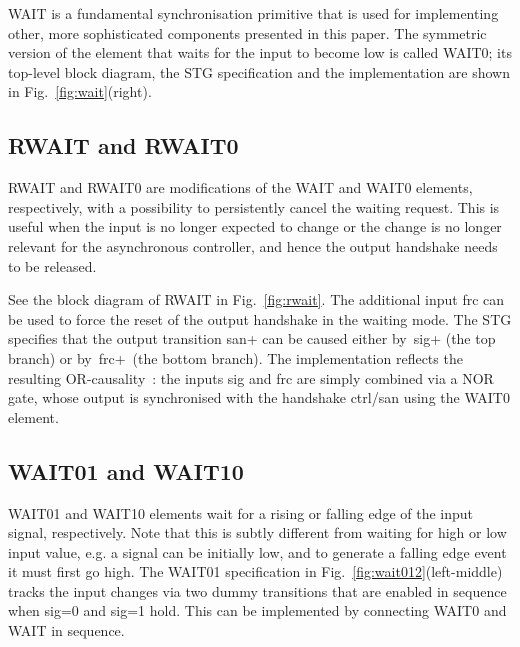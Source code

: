 \documentclass[conference]{IEEEtran}
\begin{document}
\textsf{WAIT} is a fundamental synchronisation primitive that is used for
implementing other, more sophisticated components presented in this paper.
The symmetric version of the element that waits for the input to become low is
called \textsf{WAIT0}; its top-level block diagram, the STG specification and
the implementation are shown in Fig.~\ref{fig:wait}(right).

\subsection*{\textsf{RWAIT} and \textsf{RWAIT0}}

\textsf{RWAIT} and \textsf{RWAIT0} are modifications of the \textsf{WAIT} and \textsf{WAIT0}
elements, respectively, with a possibility to persistently cancel the waiting request. This
is useful when the input is no longer expected to change or the change is no longer relevant
for the asynchronous controller, and hence the output handshake needs to be released.

See the block diagram of \textsf{RWAIT} in Fig.~\ref{fig:rwait}. The additional input
\textsf{frc} can be used to force the reset of the output handshake in the waiting mode. The
STG specifies that the output transition \textsf{san+} can be caused either by~\textsf{sig+}
(the top branch) or by~\textsf{frc+}~(the bottom branch). The implementation reflects the resulting
OR-causality~\cite{1996_yakovlev_or}: the inputs \textsf{sig} and \textsf{frc} are simply
combined via a NOR gate, whose output is synchronised with the handshake \textsf{ctrl/san}
using the \textsf{WAIT0} element.


\subsection*{\textsf{WAIT01} and \textsf{WAIT10}}

\textsf{WAIT01} and \textsf{WAIT10} elements wait for a rising or falling edge of the input
signal, respectively. Note that this is subtly different from waiting for high or low input value,
e.g. a signal can be initially low, and to generate a falling edge event it must first go high.
The \textsf{WAIT01} specification in Fig.~\ref{fig:wait012}(left-middle) tracks the input changes
via two dummy transitions that are enabled in sequence when \textsf{sig=0} and \textsf{sig=1} hold.
This can be implemented by connecting \textsf{WAIT0} and \textsf{WAIT} in sequence.
\end{document}
